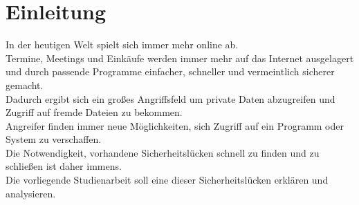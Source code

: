 \section{Einleitung}\label{sec:einleitung}

In der heutigen Welt spielt sich immer mehr online ab.\\
Termine, Meetings und Einkäufe werden immer mehr auf das Internet ausgelagert und durch passende Programme einfacher, schneller und vermeintlich sicherer gemacht.\\

Dadurch ergibt sich ein großes Angriffsfeld um private Daten abzugreifen und Zugriff auf fremde Dateien zu bekommen.\\
Angreifer finden immer neue Möglichkeiten, sich Zugriff auf ein Programm oder System zu verschaffen. \\

Die Notwendigkeit, vorhandene Sicherheitslücken schnell zu finden und zu schließen ist daher immens.\\

Die vorliegende Studienarbeit soll eine dieser Sicherheitslücken erklären und analysieren.\\